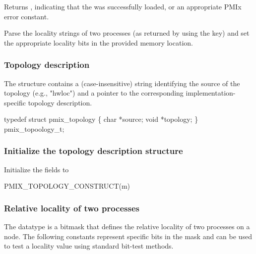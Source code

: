 Returns , indicating that the  was successfully loaded, or an appropriate \ac{PMIx} error constant.

\descr

Parse the locality strings of two processes (as returned by  using the  key) and set the appropriate  locality bits in the provided memory location.

\subsubsection{Topology description}

The  structure contains a (case-insensitive)
string identifying the source of the topology (e.g., "hwloc") and a pointer
to the corresponding implementation-specific topology description.

\cspecificstart
\begin{codepar}
typedef struct pmix_topology \{
    char *source;
    void *topology;
\} pmix_topoology_t;
\end{codepar}
\cspecificend

\subsubsection{Initialize the topology description structure}

Initialize the  fields to 

\cspecificstart
\begin{codepar}
PMIX_TOPOLOGY_CONSTRUCT(m)
\end{codepar}
\cspecificend

\begin{arglist}
\end{arglist}


\subsubsection{Relative locality of two processes}

The  datatype is a  bitmask that
defines the relative locality of two processes on a node. The following
constants represent specific bits in the mask and can be used to test a
locality value using standard bit-test methods.

